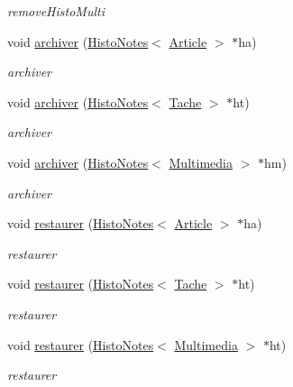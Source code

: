 \begin{DoxyCompactItemize}
\begin{DoxyCompactList}\small\item\em remove\+Histo\+Multi \end{DoxyCompactList}\item 
void \hyperlink{class_histo_note_manager_a174bebbac40d2473becb177788abd9e8}{archiver} (\hyperlink{class_histo_notes}{Histo\+Notes}$<$ \hyperlink{class_article}{Article} $>$ $\ast$ha)
\begin{DoxyCompactList}\small\item\em archiver \end{DoxyCompactList}\item 
void \hyperlink{class_histo_note_manager_abc760fb373c6fa419157fb22b90d9674}{archiver} (\hyperlink{class_histo_notes}{Histo\+Notes}$<$ \hyperlink{class_tache}{Tache} $>$ $\ast$ht)
\begin{DoxyCompactList}\small\item\em archiver \end{DoxyCompactList}\item 
void \hyperlink{class_histo_note_manager_aa28a9b85d416f403f8439952e93784a6}{archiver} (\hyperlink{class_histo_notes}{Histo\+Notes}$<$ \hyperlink{class_multimedia}{Multimedia} $>$ $\ast$hm)
\begin{DoxyCompactList}\small\item\em archiver \end{DoxyCompactList}\item 
void \hyperlink{class_histo_note_manager_a539b244703e7e7db90ac5e83d38354e7}{restaurer} (\hyperlink{class_histo_notes}{Histo\+Notes}$<$ \hyperlink{class_article}{Article} $>$ $\ast$ha)
\begin{DoxyCompactList}\small\item\em restaurer \end{DoxyCompactList}\item 
void \hyperlink{class_histo_note_manager_ad70d1e38e7c3b6ba5b85d0ecccd0455e}{restaurer} (\hyperlink{class_histo_notes}{Histo\+Notes}$<$ \hyperlink{class_tache}{Tache} $>$ $\ast$ht)
\begin{DoxyCompactList}\small\item\em restaurer \end{DoxyCompactList}\item 
void \hyperlink{class_histo_note_manager_a1241c15eae448239442070a22cc10b77}{restaurer} (\hyperlink{class_histo_notes}{Histo\+Notes}$<$ \hyperlink{class_multimedia}{Multimedia} $>$ $\ast$ht)
\begin{DoxyCompactList}\small\item\em restaurer \end{DoxyCompactList}\item 

\end{DoxyCompactItemize}
